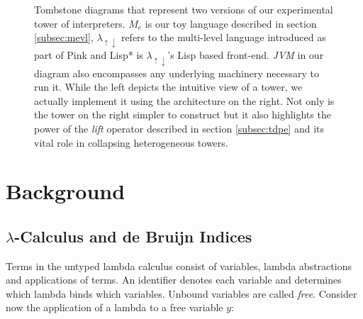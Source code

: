 \documentclass[a4paper,12pt,twoside,openright]{report}
\theoremstyle{definition}
\newcommand{\mslang}{$\lambda_{\uparrow\downarrow}$}
\newcommand{\mevl}{$M_{e}$}
\begin{document}
\begin{figure}[hb]
        \caption{Tombstone diagrams that represent two versions of our experimental tower of interpreters. \mevl{} is our toy language described in section \ref{subsec:mevl}, \mslang{} refers to the multi-level language introduced as part of Pink \cite{amin2017collapsing} and Lisp* is \mslang's Lisp based front-end. \textit{JVM} in our diagram also encompasses any underlying machinery necessary to run it. While the left depicts the intuitive view of a tower, we actually implement it using the architecture on the right. Not only is the tower on the right simpler to construct but it also highlights the power of the \textit{lift} operator described in section \ref{subsec:tdpe} and its vital role in collapsing heterogeneous towers.}
        \label{fig:tombstone}
\end{figure}
\newpage

\section{Background}\label{sec:background}
\subsection{\texorpdfstring{$\lambda$}{Lg}-Calculus and de Bruijn Indices}\label{subsec:lambda}
Terms in the untyped lambda calculus consist of variables, lambda abstractions and applications of terms. An identifier denotes each variable and determines which lambda binds which variables. Unbound variables are called \textit{free}. Consider now the application of a lambda to a free variable $y$:
\end{document}
